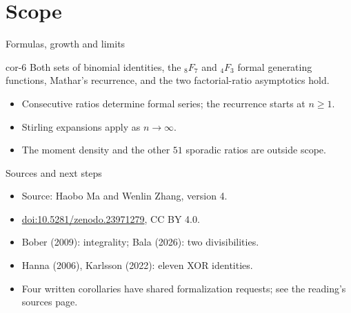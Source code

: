 \documentclass{beamer}
\begin{document}
\section{Scope}
\begin{frame}{Formulas, growth and limits}
\begin{bookresult}{cor-6}
Both sets of binomial identities, the ${}_8F_7$ and ${}_4F_3$ formal generating functions, Mathar's recurrence, and the two factorial-ratio asymptotics hold.
\end{bookresult}
\begin{itemize}
\item Consecutive ratios determine formal series; the recurrence starts at $n\geq1$.
\item Stirling expansions apply as $n\to\infty$.
\item The moment density and the other $51$ sporadic ratios are outside scope.
\end{itemize}
\end{frame}
\begin{frame}{Sources and next steps}
\begin{itemize}
\item Source: Haobo Ma and Wenlin Zhang, version 4.
\item \href{https://doi.org/10.5281/zenodo.23971279}{doi:10.5281/zenodo.23971279}, CC BY 4.0.
\item Bober (2009): integrality; Bala (2026): two divisibilities.
\item Hanna (2006), Karlsson (2022): eleven XOR identities.
\item Four written corollaries have shared formalization requests; see the reading's sources page.
\end{itemize}
\end{frame}
\appendix
\FormalVerification
\end{document}

